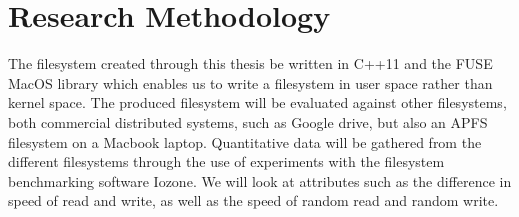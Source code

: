 
\section{Research Methodology}%


The filesystem created through this thesis be written in C++11 and the FUSE MacOS library\cite{HomeMacFUSE} which enables us to write a filesystem in user space rather than kernel space. The produced filesystem will be evaluated against other filesystems, both commercial distributed systems, such as Google drive, but also an APFS filesystem on a Macbook laptop. Quantitative data will be gathered from the different filesystems through the use of experiments with the filesystem benchmarking software Iozone\cite{IozoneFilesystemBenchmark}. We will look at attributes such as the difference in speed of read and write, as well as the speed of random read and random write. 



